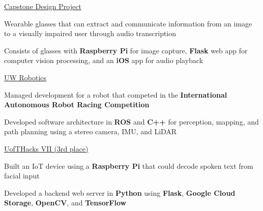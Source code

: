 \documentclass[]{awesome-cv}
\begin{document}
\begin{cventries}
	{\href{https://www.youtube.com/watch?v=aw0gHmt1xBc}{Capstone Design Project}}
	{\begin{cvitems}
		\item {Wearable glasses that can extract and communicate information from an image to a visually impaired user through audio transcription}
		\item {Consists of glasses with \textbf{Raspberry Pi} for image capture, \textbf{Flask} web app for computer vision processing, and an \textbf{iOS} app for audio playback}
	\end{cvitems}}
	{\href{https://www.uwaterloorobotics.com}{UW Robotics}}
	{\begin{cvitems}
		\item {Managed development for a robot that competed in the \textbf{International Autonomous Robot Racing Competition}}
		\item {Developed software architecture in \textbf{ROS} and \textbf{C++} for perception, mapping, and path planning using a stereo camera, IMU, and LiDAR}
	\end{cvitems}}
	{\href{https://devpost.com/software/synviz}{UofTHacks VII (3rd place)}}
	{\begin{cvitems}
		\item {Built an IoT device using a \textbf{Raspberry Pi} that could decode spoken text from facial input}
		\item {Developed a backend web server in \textbf{Python} using \textbf{Flask}, \textbf{Google Cloud Storage}, \textbf{OpenCV}, and \textbf{TensorFlow}}
	\end{cvitems}}
\end{cventries}
\end{document}
